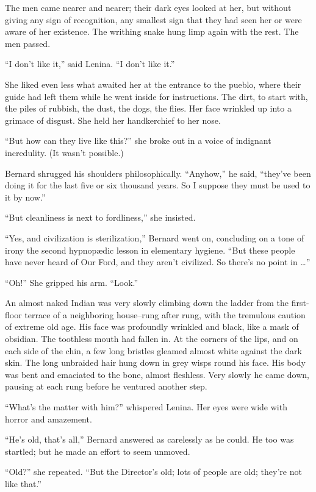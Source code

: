 \documentclass[12pt]{report}
\begin{document}
The men came nearer and nearer; their dark eyes looked at her, but
without giving any sign of recognition, any smallest sign that they had
seen her or were aware of her existence. The writhing snake hung limp
again with the rest. The men passed.

``I don't like it,'' said Lenina. ``I don't like it.''

She liked even less what awaited her at the entrance to the pueblo,
where their guide had left them while he went inside for instructions.
The dirt, to start with, the piles of rubbish, the dust, the dogs, the
flies. Her face wrinkled up into a grimace of disgust. She held her
handkerchief to her nose.

``But how can they live like this?'' she broke out in a voice of
indignant incredulity. (It wasn't possible.)

Bernard shrugged his shoulders philosophically. ``Anyhow,'' he said,
``they've been doing it for the last five or six thousand years. So I
suppose they must be used to it by now.''

``But cleanliness is next to fordliness,'' she insisted.

``Yes, and civilization is sterilization,'' Bernard went on, concluding
on a tone of irony the second hypnopædic lesson in elementary hygiene.
``But these people have never heard of Our Ford, and they aren't
civilized. So there's no point in \ldots{}''

``Oh!'' She gripped his arm. ``Look.''

An almost naked Indian was very slowly climbing down the ladder from the
first-floor terrace of a neighboring house--rung after rung, with the
tremulous caution of extreme old age. His face was profoundly wrinkled
and black, like a mask of obsidian. The toothless mouth had fallen in.
At the corners of the lips, and on each side of the chin, a few long
bristles gleamed almost white against the dark skin. The long unbraided
hair hung down in grey wisps round his face. His body was bent and
emaciated to the bone, almost fleshless. Very slowly he came down,
pausing at each rung before he ventured another step.

``What's the matter with him?'' whispered Lenina. Her eyes were wide
with horror and amazement.

``He's old, that's all,'' Bernard answered as carelessly as he could. He
too was startled; but he made an effort to seem unmoved.

``Old?'' she repeated. ``But the Director's old; lots of people are old;
they're not like that.''
\end{document}

